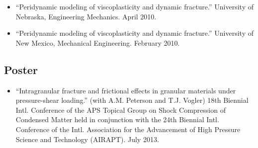 \begin{itemize}
    \item ``Peridynamic modeling of viscoplasticity and dynamic fracture.''  University of Nebraska, Engineering Mechanics. April 2010.

    \item ``Peridynamic modeling of viscoplasticity and dynamic fracture.''  University of New Mexico, Mechanical Engineering. February 2010.
\end{itemize}

\subsection*{Poster}

\begin{itemize}
  \item ``Intragranular fracture and frictional effects in granular materials under pressure-shear loading.'' (with A.M. Peterson and T.J. Vogler) 18th Biennial Intl. Conference of the APS Topical Group on Shock Compression of Condensed Matter held in conjunction with the 24th Biennial Intl. Conference of the Intl. Association for the Advancement of High Pressure Science and Technology (AIRAPT). July 2013.
\end{itemize}


